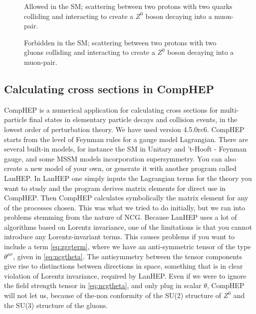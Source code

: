 \begin{figure}[htp]
	\centering
	\begin{minipage}[b]{0.475\linewidth} 
    \centering
	  
	  \caption{Allowed in the SM; scattering between two protons with two quarks colliding and interacting to create a $Z^0$ boson decaying into a muon-pair.} \label{fig:feyn:parton_qq}
	\end{minipage}
	\hspace{0.5cm}
	\begin{minipage}[b]{0.475\linewidth} 
    \centering
	  
	  \caption{Forbidden in the SM; scattering between two protons with two gluons colliding and interacting to create a $Z^0$ boson decaying into a muon-pair.} \label{fig:feyn:parton_gg}%
	\end{minipage}
\end{figure}

\subsection{Calculating cross sections in CompHEP}
CompHEP is a numerical application for calculating cross sections for multi-particle final states in elementary particle decays and collision events, in the lowest order of perturbation theory. We have used version 4.5.0rc6. CompHEP starts from the level of Feynman rules for a gauge model Lagrangian. There are several built-in models, for instance the SM in Unitary and 't-Hooft - Feynman gauge, and some MSSM models incorporation supersymmetry. You can also create a new model of your own, or generate it with another program called LanHEP. In LanHEP one simply inputs the Lagrangian terms for the theory you want to study and the program derives matrix elements for direct use in CompHEP. Then CompHEP calculates symbolically the matrix element for any of the processes chosen. This was what we tried to do initially, but we ran into problems stemming from the nature of NCG. Because LanHEP uses a lot of algorithms based on Lorentz invariance, one of the limitations is that you cannot introduce any Lorentz-invariant terms. This causes problems if you want to include a term \eqref{eq:zggterm}, where we have an anti-symmetric tensor of the type $\theta^{\mu\nu}$, given in \eqref{eq:ncgtheta}. The antisymmetry between the tensor components give rise to distinctions between directions in space, something that is in clear violation of Lorentz invariance, required by LanHEP. Even if we were to ignore the field strength tensor in \eqref{eq:ncgtheta}, and only plug in scalar $\theta$, CompHEP will not let us, because of the-non conformity of the SU(2) structure of $Z^0$ and the SU(3) structure of the gluons.


